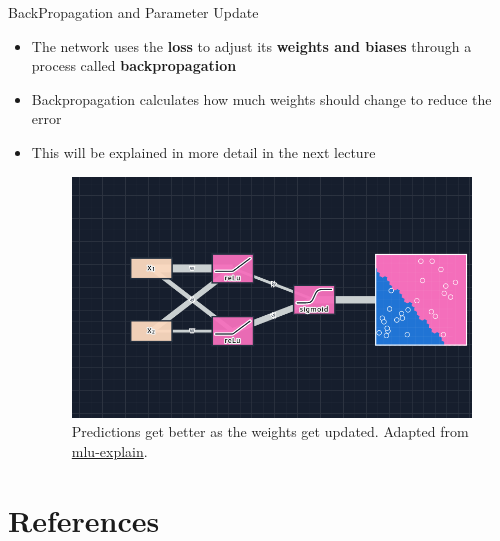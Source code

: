 \documentclass[serif, aspectratio=169]{beamer}
\begin{document}
\begin{frame}[t]{BackPropagation and Parameter Update}
    \begin{itemize}
        \item The network uses the \textbf{loss} to adjust its \textbf{weights and biases} through a process called \textbf{backpropagation}
        \item Backpropagation calculates how much weights should change to reduce the error
        \item This will be explained in more detail in the next lecture
        \begin{figure}[bh]
            \centering
            \includegraphics[keepaspectratio, scale=0.25]{pic/4/after-backprop.png} \\
            {\scriptsize Predictions get better as the weights get updated. Adapted from \href{https://mlu-explain.github.io/neural-networks/}{mlu-explain}.}
        \end{figure}
    \end{itemize}
\end{frame}


\section{References}

% 
%    
\end{document}
